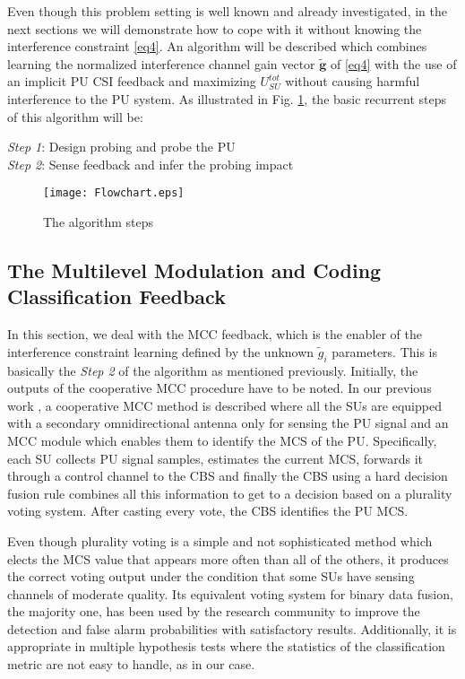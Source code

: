 \documentclass[journal]{IEEEtran}
\begin{document}
Even though this problem setting is well known and already investigated, in the next sections we will demonstrate how to cope with it without knowing the interference constraint \eqref{eq4}. An algorithm will be described which combines learning the normalized interference channel gain vector $\mathbf{\tilde{g}}$ of \eqref{eq4} with the use of an implicit PU CSI feedback and maximizing $U_{SU}^{tot}$ without causing harmful interference to the PU system. As illustrated in Fig. \ref{fig12}, the basic recurrent steps of this algorithm will be:

\begin{description}
  \item[]
  \item[\textit{Step 1}: Design probing and probe the PU]
  \item[]
  \item[\textit{Step 2}: Sense feedback and infer the probing impact]
  \item[]
\end{description}

\begin{figure}[ht!]
\centering
\texttt{[image: Flowchart.eps]}
\caption{The algorithm steps}
\label{fig12}
\end{figure}

\subsection{The Multilevel Modulation and Coding Classification Feedback}

In this section, we deal with the MCC feedback, which is the enabler of the interference constraint learning defined by the unknown $\tilde{g}_{i}$ parameters. This is basically the \textit{Step 2} of the algorithm as mentioned previously. Initially, the outputs of the cooperative MCC procedure have to be noted. In our previous work \cite{biban80}, a cooperative MCC method is described where all the SUs are equipped with a secondary omnidirectional antenna only for sensing the PU signal and an MCC module which enables them to identify the MCS of the PU. Specifically, each SU collects PU signal samples, estimates the current MCS, forwards it through a control channel to the CBS and finally the CBS using a hard decision fusion rule combines all this information to get to a decision based on a plurality voting system. After casting every vote, the CBS identifies the PU MCS.

Even though plurality voting is a simple and not sophisticated method which elects the MCS
value that appears more often than all of the others, it produces the correct voting output under the condition that some SUs have sensing channels of moderate quality. Its equivalent voting system for binary data fusion, the majority one, has been used by the research community to improve the detection and false alarm probabilities with satisfactory results. Additionally, it is appropriate in multiple hypothesis tests where the statistics of the classification metric are not easy to handle, as in our case.
\end{document}
